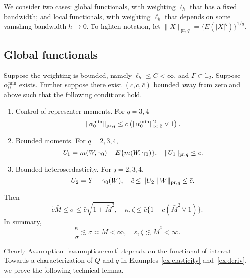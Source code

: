 We consider two cases: global functionals, with weighting $\ell_h$ that has a fixed bandwidth; and local functionals, with weighting $\ell_h$ that depends on some vanishing bandwidth $h\rightarrow 0$. To lighten notation, let $\|X\|_{\text{pr},q}=\{E(|X|^q)\}^{1/q}$.

\subsection{Global functionals}

\begin{lemma}\label{lemma:global}
Suppose the weighting is bounded,  namely $\ell_h \leq C<\infty$, and $\Gamma\subset \mathbb{L}_2$. Suppose $\alpha_0^{\min}$ exists. Further suppose there exist $(c,\tilde{c},\bar c)$ bounded away from zero and above such that the following conditions hold.
\begin{enumerate}
    \item Control of representer moments. For $q=3,4$
    $$
\|\alpha_0^{\min}\|_{\text{\normalfont pr},q}\leq c \left( \|\alpha_0^{\min}\|^2_{\text{\normalfont pr},2} \vee 1\right).
$$
    \item Bounded moments. For $q=2,3,4$,
    $$
    U_1=m(W,\gamma_0)-E\{m(W,\gamma_0)\},\quad \|U_1\|_{\text{\normalfont pr},q}\leq \bar{c}.
    $$
    \item Bounded heteroscedasticity. For $q=2,3,4$,
    $$
    U_2=Y-\gamma_0(W),\quad \tilde{c}\leq \|U_2 \mid W\|_{\text{\normalfont pr},q}\leq \bar{c}.
    $$
\end{enumerate}
Then
    $$
    \tilde{c}  \bar{M}   \leq \sigma  \leq  \bar c  \sqrt{1+ \bar{M}^2}, 
 \quad \kappa,\zeta  \leq  \bar c   \{1+ c (\bar{M}^2 \vee 1) \}.
    $$
In summary,
$$
\frac{\kappa}{\sigma} \lesssim \sigma \asymp \bar{M} < \infty,\quad \kappa, \zeta\lesssim \bar{M}^2 < \infty.
$$
\end{lemma}

Clearly Assumption~\ref{assumption:cont} depends on the functional of interest. Towards a characterization of $\bar{Q}$ and $q$ in Examples~\ref{ex:elasticity} and~\ref{ex:deriv}, we prove the following technical lemma.

